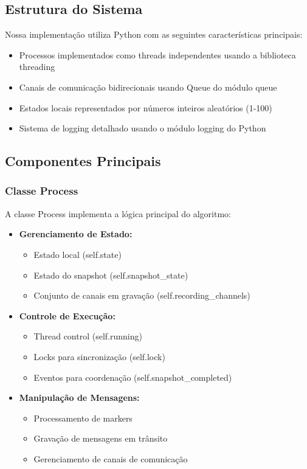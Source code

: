 \documentclass[12pt]{article}
\begin{document}
\subsection{Estrutura do Sistema}

Nossa implementação utiliza Python com as seguintes características principais:

\begin{itemize}
    \item Processos implementados como threads independentes usando a biblioteca threading
    \item Canais de comunicação bidirecionais usando Queue do módulo queue
    \item Estados locais representados por números inteiros aleatórios (1-100)
    \item Sistema de logging detalhado usando o módulo logging do Python
\end{itemize}

\subsection{Componentes Principais}

\subsubsection{Classe Process}

A classe Process implementa a lógica principal do algoritmo:

\begin{itemize}
    \item \textbf{Gerenciamento de Estado:}
        \begin{itemize}
            \item Estado local (self.state)
            \item Estado do snapshot (self.snapshot\_state)
            \item Conjunto de canais em gravação (self.recording\_channels)
        \end{itemize}
    \item \textbf{Controle de Execução:}
        \begin{itemize}
            \item Thread control (self.running)
            \item Locks para sincronização (self.lock)
            \item Eventos para coordenação (self.snapshot\_completed)
        \end{itemize}
    \item \textbf{Manipulação de Mensagens:}
        \begin{itemize}
            \item Processamento de markers
            \item Gravação de mensagens em trânsito
            \item Gerenciamento de canais de comunicação
        \end{itemize}
\end{itemize}
\end{document}
